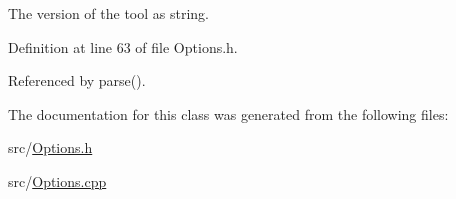 The version of the tool as string. 



Definition at line 63 of file Options.\-h.



Referenced by parse().



The documentation for this class was generated from the following files\-:\begin{DoxyCompactItemize}
\item 
src/\hyperlink{Options_8h}{Options.\-h}\item 
src/\hyperlink{Options_8cpp}{Options.\-cpp}\end{DoxyCompactItemize}
